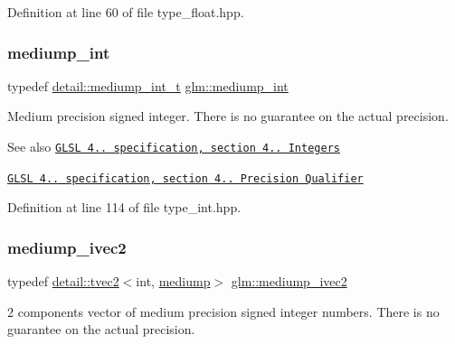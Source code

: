 Definition at line 60 of file type\+\_\+float.\+hpp.

\mbox{\label{group__core__precision_ga2a3dcbcd7f4e17663d393a12061ac6ac}} 
\subsubsection{\texorpdfstring{mediump\+\_\+int}{mediump\_int}}
{\footnotesize\ttfamily typedef \hyperlink{namespaceglm_1_1detail_aede0757f19204d1d44f716b3dd66d13c}{detail\+::mediump\+\_\+int\+\_\+t} \hyperlink{group__core__precision_ga2a3dcbcd7f4e17663d393a12061ac6ac}{glm\+::mediump\+\_\+int}}

Medium precision signed integer. There is no guarantee on the actual precision.

\begin{DoxySeeAlso}{See also}
\href{http://www.opengl.org/registry/doc/GLSLangSpec.4.20.8.pdf}{\tt G\+L\+SL 4.. specification, section 4.. Integers} 

\href{http://www.opengl.org/registry/doc/GLSLangSpec.4.20.8.pdf}{\tt G\+L\+SL 4.. specification, section 4.. Precision Qualifier} 
\end{DoxySeeAlso}


Definition at line 114 of file type\+\_\+int.\+hpp.

\mbox{\label{group__core__precision_ga4f1bf9844e667805235823afe809aa73}} 
\subsubsection{\texorpdfstring{mediump\+\_\+ivec2}{mediump\_ivec2}}
{\footnotesize\ttfamily typedef \hyperlink{structglm_1_1detail_1_1tvec2}{detail\+::tvec2}$<$int, \hyperlink{namespaceglm_a0f04f086094c747d227af4425893f545a6416f3ea0c9025fb21ed50c4d6620482}{mediump}$>$ \hyperlink{group__core__precision_ga4f1bf9844e667805235823afe809aa73}{glm\+::mediump\+\_\+ivec2}}

2 components vector of medium precision signed integer numbers. There is no guarantee on the actual precision.

